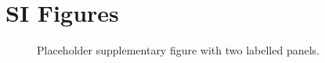 \section{SI Figures}

\begin{figure}[htbp]
  \hfill
  \caption{Placeholder supplementary figure with two labelled panels.}
  \label{fig:ch2-si-fig1}
\end{figure}
